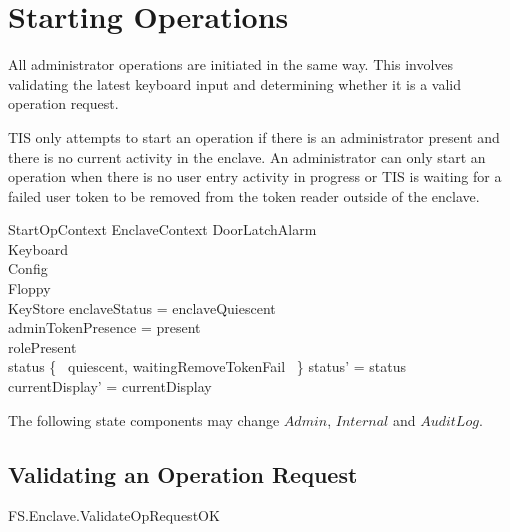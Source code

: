 \section{Starting Operations}



All administrator operations are initiated in the same way. This
involves validating the latest keyboard input and determining whether
it is a valid operation request.

TIS only attempts to start an operation if there is an administrator
present and there is no current activity in the enclave.
An administrator can only start an operation when there is no user
entry activity in progress or TIS is waiting for a failed user token 
to be removed from the token reader outside of the enclave.

\begin{schema}{StartOpContext}
        EnclaveContext
\also
        \Xi DoorLatchAlarm
\\      \Xi Keyboard
\\      \Xi Config
\\      \Xi Floppy
\\      \Xi KeyStore
\where
        enclaveStatus = enclaveQuiescent
\\      adminTokenPresence = present
\\      rolePresent \neq \Nil
\\      status \in \{~ quiescent, waitingRemoveTokenFail ~\}
\also
        status' = status
\\      currentDisplay' = currentDisplay
\end{schema}
\begin{Zcomment}
\item
The following state components may change   
$Admin$, $Internal$ and $AuditLog$. 
\end{Zcomment}

\subsection{Validating an Operation Request}
\begin{traceunit}{FS.Enclave.ValidateOpRequestOK}
\end{traceunit}


